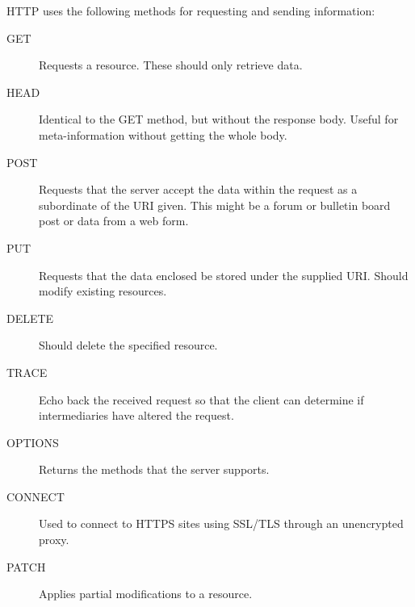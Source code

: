 \documentclass[a4paper,11pt]{report}
\begin{document}
		HTTP uses the following methods for requesting and sending information:
		\begin{description}
			\item[GET] Requests a resource. These should only retrieve data. 
			\item[HEAD] Identical to the GET method, but without the response body. 
				Useful for meta-information without getting the whole body. 
			\item[POST] Requests that the server accept the data within the request as a subordinate of the URI given. 
				This might be a forum or bulletin board post or data from a web form. 
			\item[PUT] Requests that the data enclosed be stored under the supplied URI. Should modify existing resources. 
			\item[DELETE] Should delete the specified resource. 
			\item[TRACE] Echo back the received request so that the client can determine if intermediaries have altered the request. 
			\item[OPTIONS] Returns the methods that the server supports. 
			\item[CONNECT] Used to connect to HTTPS sites using SSL/TLS through an unencrypted proxy. 
			\item[PATCH] Applies partial modifications to a resource. 
		\end{description}
\end{document}
